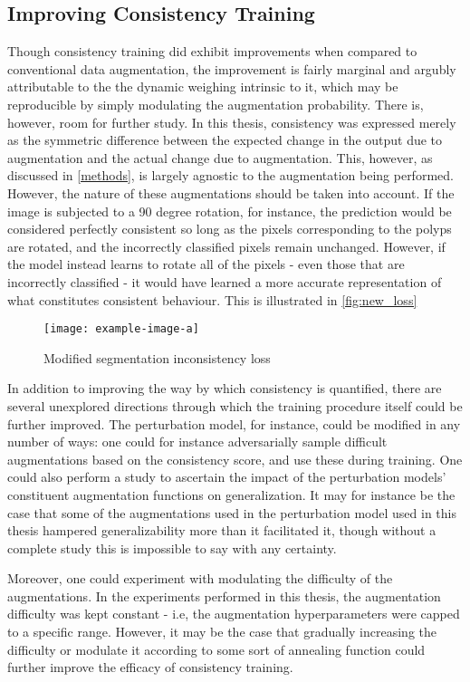     \subsection{Improving Consistency Training}
        Though consistency training did exhibit improvements when compared to conventional data augmentation, the improvement is fairly marginal and argubly attributable to the the dynamic weighing intrinsic to it, which may be reproducible by simply modulating the augmentation probability. There is, however, room for further study. In this thesis, consistency was expressed merely as the symmetric difference between the expected change in the output due to augmentation and the actual change due to augmentation. This, however, as discussed in \autoref{methods}, is largely agnostic to the augmentation being performed. However, the nature of these augmentations should be taken into account. If the image is subjected to a 90 degree rotation, for instance, the prediction would be considered perfectly consistent so long as the pixels corresponding to the polyps are rotated, and the incorrectly classified pixels remain unchanged. However, if the model instead learns to rotate all of the pixels - even those that are incorrectly classified - it would have learned a more accurate representation of what constitutes consistent behaviour. This is illustrated in \autoref{fig:new_loss}
        \begin{figure}
            \centering
            \texttt{[image: example-image-a]}
            \caption{Modified segmentation inconsistency loss}
            \label{fig:new_loss}
        \end{figure}
        In addition to improving the way by which consistency is quantified, there are several unexplored directions through which the training procedure itself could be further improved. The perturbation model, for instance, could be modified in any number of ways: one could for instance adversarially sample difficult augmentations based on the consistency score, and use these during training. One could also perform a study to ascertain the impact of the perturbation models' constituent augmentation functions on generalization. It may for instance be the case that some of the augmentations used in the perturbation model used in this thesis hampered generalizability more than it facilitated it, though without a complete study this is impossible to say with any certainty.  
        
        Moreover, one could experiment with modulating the difficulty of the augmentations. In the experiments performed in this thesis, the augmentation difficulty was kept constant - i.e, the augmentation hyperparameters were capped to a specific range. However, it may be the case that gradually increasing the difficulty or modulate it according to some sort of annealing function could further improve the efficacy of consistency training. 
